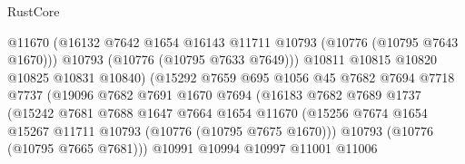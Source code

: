 \begin{lexlean}{RustCore}
\begin{coremodule}
                                      @11670
                                      (@16132
                                        @7642
                                        @1654
                                        @16143
                                        @11711
                                        @10793
                                        (@10776 (@10795 @7643 @1670)))
                                      @10793
                                      (@10776 (@10795 @7633 @7649)))
                                    @10811
                                    @10815
                                    @10820
                                    @10825
                                    @10831
                                    @10840)
                                  (@15292
                                    @7659
                                    @695
                                    @1056
                                    @45
                                    @7682
                                    @7694
                                    @7718
                                    @7737
                                    (@19096
                                      @7682
                                      @7691
                                      @1670
                                      @7694
                                      (@16183
                                        @7682
                                        @7689
                                        @1737
                                        (@15242
                                          @7681
                                          @7688
                                          @1647
                                          @7664
                                          @1654
                                          @11670
                                          (@15256
                                            @7674
                                            @1654
                                            @15267
                                            @11711
                                            @10793
                                            (@10776 (@10795 @7675 @1670)))
                                          @10793
                                          (@10776 (@10795 @7665 @7681)))
                                        @10991
                                        @10994
                                        @10997
                                        @11001
                                        @11006

\end{coremodule}
\end{lexlean}
